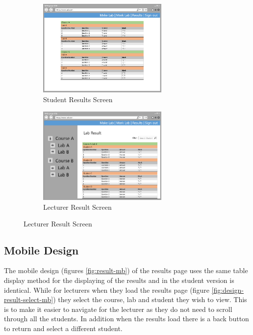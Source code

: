 \documentclass[11pt]{report}
\begin{document}
\begin{figure}[H]
\caption{Results Page: Desktop Designs}
\label{fig:result-pc}
\centering
\begin{subfigure}[c]{0.45\textwidth}
    \centering
    \includegraphics[width=0.70\textwidth]{images/design/result-student-desktop.png}
    \caption{Student Results Screen}
    \label{fig:design-result-student-pc}
\end{subfigure}
\hfill
\begin{subfigure}[c]{0.45\textwidth}
    \centering
    \includegraphics[width=0.7\textwidth]{images/design/result-lecturer-desktop.png}
    \caption{Lecturer Result Screen}
    \label{fig:design-result-lecturer-pc}
\end{subfigure}
\end{figure}

\subsection*{Mobile Design}

\noindent The mobile design (figures \ref{fig:result-mb}) of the results page uses the same table display method for the displaying of the results and in the student version is identical. While for lecturers when they load the results page (figure \ref{fig:design-result-select-mb}) they select the course, lab and student they wish to view. This is to make it easier to navigate for the lecturer as they do not need to scroll through all the students. In addition when the results load there is a back button to return and select a different student.
\end{document}
